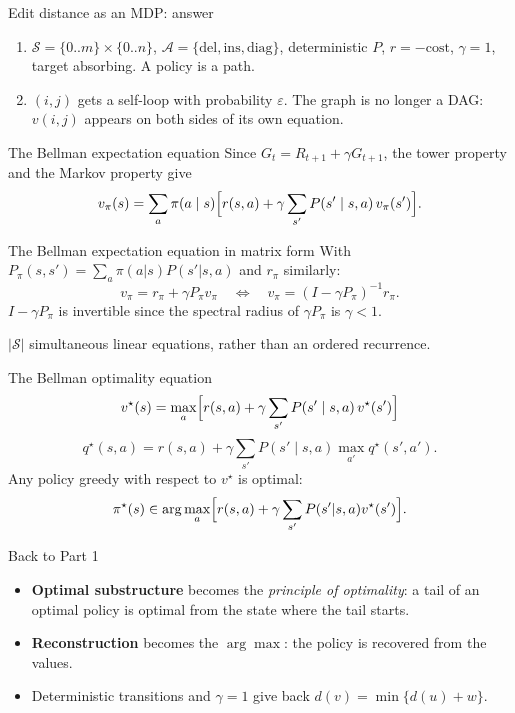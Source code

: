 \begin{frame}{Edit distance as an MDP: answer}
	\begin{enumerate}
		\item $\mathcal S=\{0..m\}\times\{0..n\}$, $\mathcal A=\{\text{del},\text{ins},\text{diag}\}$, deterministic $P$,
		$r=-\text{cost}$, $\gamma=1$, target absorbing. A policy is a path.
		\item $(i,j)$ gets a \alert{self-loop} with probability $\varepsilon$. The graph is no longer a DAG:
		$v(i,j)$ appears on both sides of its own equation.
	\end{enumerate}
\end{frame}

\begin{frame}{The Bellman expectation equation}
	Since $G_t=R_{t+1}+\gamma G_{t+1}$, the tower property and the Markov property give
	\[
		v_\pi(s)=\sum_a\pi(a\mid s)\Bigl[r(s,a)+\gamma\sum_{s'}P(s'\mid s,a)\,v_\pi(s')\Bigr].
	\]
\end{frame}

\begin{frame}{The Bellman expectation equation in matrix form}
	With $P_\pi(s,s')=\sum_a\pi(a|s)P(s'|s,a)$ and $r_\pi$ similarly:
	\[
		v_\pi=r_\pi+\gamma P_\pi v_\pi\quad\Longleftrightarrow\quad v_\pi=(I-\gamma P_\pi)^{-1}r_\pi.
	\]
	$I-\gamma P_\pi$ is invertible since the spectral radius of $\gamma P_\pi$ is $\gamma<1$.

	\seprule

	$|\mathcal S|$ \alert{simultaneous} linear equations, rather than an ordered recurrence.
\end{frame}

\begin{frame}{The Bellman optimality equation}
	\[
		v^\star(s)=\max_{a}\Bigl[r(s,a)+\gamma\sum_{s'}P(s'\mid s,a)\,v^\star(s')\Bigr]
	\]
	\[
		q^\star(s,a)=r(s,a)+\gamma\sum_{s'}P(s'\mid s,a)\max_{a'}q^\star(s',a').
	\]
	Any policy greedy with respect to $v^\star$ is optimal:
	\[
		\pi^\star(s)\in\arg\max_a\Bigl[r(s,a)+\gamma\sum_{s'}P(s'|s,a)v^\star(s')\Bigr].
	\]
\end{frame}

\begin{frame}{Back to Part 1}
	\begin{itemize}
		\item \textbf{Optimal substructure} becomes the \emph{principle of optimality}: a tail of an optimal policy is optimal from the state where the tail starts.
		\item \textbf{Reconstruction} becomes the $\arg\max$: the policy is recovered from the values.
		\item Deterministic transitions and $\gamma=1$ give back $d(v)=\min\{d(u)+w\}$.
	\end{itemize}
\end{frame}

